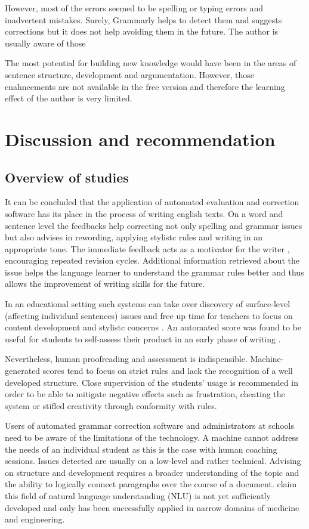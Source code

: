 \documentclass[runningheads]{llncs}
\let\OldTextregistered\textregistered
\renewcommand{\textregistered}{\OldTextregistered\xspace}
\begin{document}
However, most of the errors seemed to be spelling or typing errors and inadvertent mistakes. Surely, Grammarly\textregistered helps to detect them and suggests corrections but it does not help avoiding them in the future. The author is usually aware of those 

The most potential for building new knowledge would have been in the areas of sentence structure, development and argumentation. However, those enahncements are not available in the free version and therefore the learning effect of the author is very limited.

\section{Discussion and recommendation}
\subsection{Overview of studies}
It can be concluded that the application of automated evaluation and correction software has its place in the process of writing english texts. On a word and sentence level the feedbacks help correcting not only spelling and grammar issues but also advises in rewording, applying stylistc rules and writing in an appropriate tone. The immediate feedback acts as a motivator for the writer \citep{grimes_utility_2010}, encouraging repeated revision cycles. Additional information retrieved about the issue helps the language learner to understand the grammar rules better and thus allows the improvement of writing skills for the future. 

In an educational setting such systems can take 
over discovery of surface-level (affecting individual sentences) issues and free up time for teachers to focus on content development and stylistc concerns \citep{dembsey_closing_2017}. An automated score was found to be useful for students to self-assess their product in an early phase of writing \citep{grimes_utility_2010}. 

Nevertheless, human proofreading and assessment is indispensible. Machine-generated scores tend to focus on strict rules and lack the recognition of a well developed structure. Close supervision of the students' usage is recommended in order to be able to mitigate negative effects such as frustration, cheating the system or stifled creativity through conformity with rules.

Users of automated grammar correction software and administrators at schools need to be aware of the limitations of the technology. A machine cannot address the needs of an individual student as this is the case with human coaching sessions. Issues detected are usually on a low-level and rather technical. Advising on structure and development requires a broader understanding of the topic and the ability to logically connect paragraphs over the course of a document. \textcite{grimes_utility_2010} claim this field of natural language understanding (NLU) is not yet sufficiently developed and only has been successfully applied in narrow domains of medicine and engineering.
\end{document}
